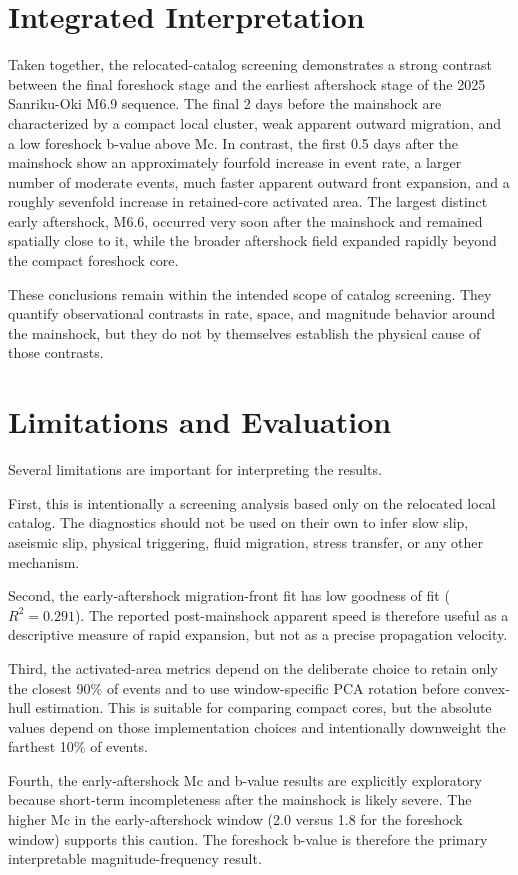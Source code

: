 \documentclass[11pt]{article}
\begin{document}
\section{Integrated Interpretation}
Taken together, the relocated-catalog screening demonstrates a strong contrast between the final foreshock stage and the earliest aftershock stage of the 2025 Sanriku-Oki M6.9 sequence. The final 2 days before the mainshock are characterized by a compact local cluster, weak apparent outward migration, and a low foreshock b-value above Mc. In contrast, the first 0.5 days after the mainshock show an approximately fourfold increase in event rate, a larger number of moderate events, much faster apparent outward front expansion, and a roughly sevenfold increase in retained-core activated area. The largest distinct early aftershock, M6.6, occurred very soon after the mainshock and remained spatially close to it, while the broader aftershock field expanded rapidly beyond the compact foreshock core.

These conclusions remain within the intended scope of catalog screening. They quantify observational contrasts in rate, space, and magnitude behavior around the mainshock, but they do not by themselves establish the physical cause of those contrasts.

\section{Limitations and Evaluation}
Several limitations are important for interpreting the results.

First, this is intentionally a screening analysis based only on the relocated local catalog. The diagnostics should not be used on their own to infer slow slip, aseismic slip, physical triggering, fluid migration, stress transfer, or any other mechanism.

Second, the early-aftershock migration-front fit has low goodness of fit ($R^2 = 0.291$). The reported post-mainshock apparent speed is therefore useful as a descriptive measure of rapid expansion, but not as a precise propagation velocity.

Third, the activated-area metrics depend on the deliberate choice to retain only the closest 90\% of events and to use window-specific PCA rotation before convex-hull estimation. This is suitable for comparing compact cores, but the absolute values depend on those implementation choices and intentionally downweight the farthest 10\% of events.

Fourth, the early-aftershock Mc and b-value results are explicitly exploratory because short-term incompleteness after the mainshock is likely severe. The higher Mc in the early-aftershock window (2.0 versus 1.8 for the foreshock window) supports this caution. The foreshock b-value is therefore the primary interpretable magnitude-frequency result.
\end{document}

